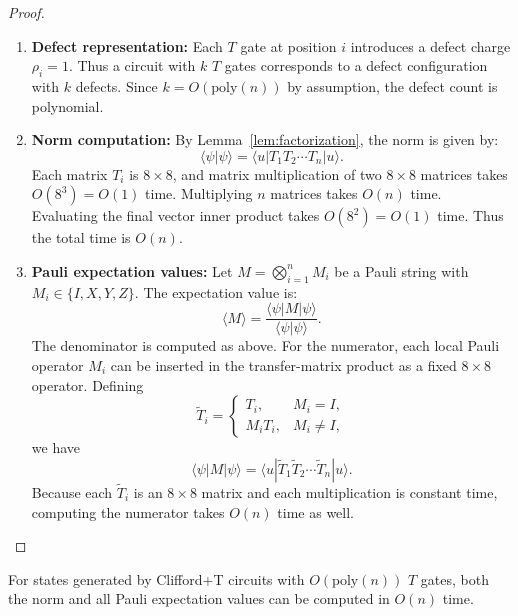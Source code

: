 \begin{proof}
\begin{enumerate}
    \item \textbf{Defect representation:} Each $T$ gate at position $i$ introduces a defect charge $\rho_i = 1$. Thus a circuit with $k$ $T$ gates corresponds to a defect configuration with $k$ defects. Since $k = O(\text{poly}(n))$ by assumption, the defect count is polynomial.
    
    \item \textbf{Norm computation:} By Lemma~\ref{lem:factorization}, the norm is given by:
    \begin{equation}
    \langle\psi|\psi\rangle = \langle u | T_1 T_2 \cdots T_n | u \rangle.
    \end{equation}
    Each matrix $T_i$ is $8 \times 8$, and matrix multiplication of two $8 \times 8$ matrices takes $O(8^3) = O(1)$ time. Multiplying $n$ matrices takes $O(n)$ time. Evaluating the final vector inner product takes $O(8^2) = O(1)$ time. Thus the total time is $O(n)$.
    
    \item \textbf{Pauli expectation values:} Let $M = \bigotimes_{i=1}^n M_i$ be a Pauli string with $M_i \in \{I, X, Y, Z\}$. The expectation value is:
    \begin{equation}
    \langle M \rangle = \frac{\langle \psi | M | \psi \rangle}{\langle \psi | \psi \rangle}.
    \end{equation}
    The denominator is computed as above. For the numerator, each local Pauli operator $M_i$ can be inserted in the transfer-matrix product as a fixed $8 \times 8$ operator. Defining
    \begin{equation}
    \tilde{T}_i = \begin{cases}
    T_i, & M_i = I, \\
    M_i T_i, & M_i \neq I,
    \end{cases}
    \end{equation}
    we have
    \begin{equation}
    \langle \psi | M | \psi \rangle = \langle u | \tilde{T}_1 \tilde{T}_2 \cdots \tilde{T}_n | u \rangle.
    \end{equation}
    Because each $\tilde{T}_i$ is an $8 \times 8$ matrix and each multiplication is constant time, computing the numerator takes $O(n)$ time as well.
\end{enumerate}
\end{proof}

\begin{corollary}
For states generated by Clifford+T circuits with $O(\text{poly}(n))$ $T$ gates, both the norm and all Pauli expectation values can be computed in $O(n)$ time.
\end{corollary}

